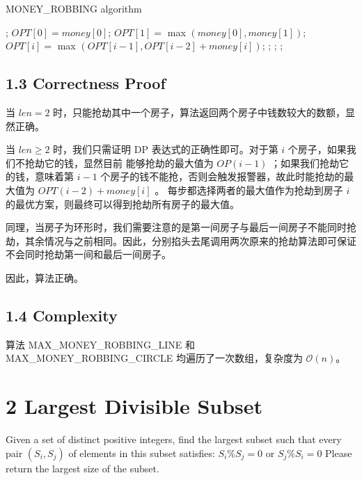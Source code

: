 \documentclass[UTF8]{ctexart}
\begin{document}
\begin{algorithm}[h]
	\caption{MONEY\_ROBBING algorithm}
	\begin{algorithmic}[1]
            \State {};
        \EndIf 
        \State $OPT[0] = money[0]$;  $OPT[1] =$ max $(money[0], money[1])$; 
            \State $OPT[i] =$ max $(OPT[i-1], OPT[i-2] + money[i])$;
        \EndFor
        \State {};
        \EndFunction
            \State {};
        \EndIf 
        \State {};
        \EndFunction
	\end{algorithmic}
\end{algorithm}

\subsection*{1.3 Correctness Proof}
当 $len = 2$ 时，只能抢劫其中一个房子，算法返回两个房子中钱数较大的数额，显然正确。

当 $len \ge 2$ 时，我们只需证明 DP 表达式的正确性即可。对于第 $i$ 个房子，如果我们不抢劫它的钱，显然目前
能够抢劫的最大值为 $OP(i-1)$ ；如果我们抢劫它的钱，意味着第 $i-1$ 个房子的钱不能抢，否则会触发报警器，故此时能抢劫的最大值为 $OPT(i-2) + money[i]$ 。
每步都选择两者的最大值作为抢劫到房子 $i$ 的最优方案，则最终可以得到抢劫所有房子的最大值。

同理，当房子为环形时，我们需要注意的是第一间房子与最后一间房子不能同时抢劫，其余情况与之前相同。因此，分别掐头去尾调用两次原来的抢劫算法即可保证不会同时抢劫第一间和最后一间房子。

因此，算法正确。
\subsection*{1.4 Complexity}
算法 MAX\_MONEY\_ROBBING\_LINE 和 MAX\_MONEY\_ROBBING\_CIRCLE 均遍历了一次数组，复杂度为 $\mathcal{O}(n)$。

\section*{2 Largest Divisible Subset}
Given a set of distinct positive integers, find the largest subset such that every pair $\left(S_{i}, S_{j}\right)$ of elements in this subset satisfies: $S_{i} \% S_{j}=0$ or $S_{j} \% S_{i}=0$ Please return the largest size of the subset.
\end{document}
